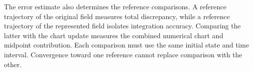 The error estimate also determines the reference comparisons. A reference trajectory of the original field measures total discrepancy, while a reference trajectory of the represented field isolates integration accuracy. Comparing the latter with the chart update measures the combined numerical chart and midpoint contribution. Each comparison must use the same initial state and time interval. Convergence toward one reference cannot replace comparison with the other.

